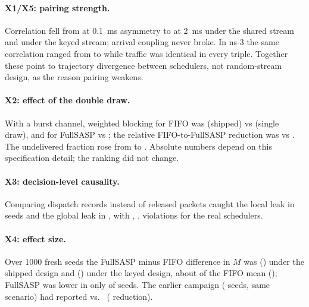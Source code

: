 \documentclass[11pt]{article}
\begin{document}
\paragraph{X1/X5: pairing strength.} Correlation fell from \XOneRhoLow{} at 0.1~ms asymmetry to \XOneRhoHigh{} at 2~ms under the shared stream and \XOneRhoHighKeyed{} under the keyed stream; arrival coupling never broke. In ns-3 the same correlation ranged from \XFiveRhoMin{} to \XFiveRhoMax{} while traffic was identical in every triple. Together these point to trajectory divergence between schedulers, not random-stream design, as the reason pairing weakens.
\paragraph{X2: effect of the double draw.} With a burst channel, weighted blocking for FIFO was \XTwoMShipFIFO{} (shipped) vs \XTwoMSingleFIFO{} (single draw), and for FullSASP \XTwoMShipSASP{} vs \XTwoMSingleSASP{}; the relative FIFO-to-FullSASP reduction was \XTwoRedShip{} vs \XTwoRedSingle{}. The undelivered fraction rose from \XTwoUndelShip{} to \XTwoUndelSingle{}. Absolute numbers depend on this specification detail; the ranking did not change.
\paragraph{X3: decision-level causality.} Comparing dispatch records instead of released packets caught the local leak in \XThreeLeakyLocal{} seeds and the global leak in \XThreeLeakyGlobal{}, with \XThreeFIFO{}, \XThreeFullSASP{}, \XThreeMeanOnly{} violations for the real schedulers.
\paragraph{X4: effect size.} Over 1000 fresh seeds the FullSASP minus FIFO difference in $M$ was \XFourDShared{} (\XFourCIShared{}) under the shipped design and \XFourDKeyed{} (\XFourCIKeyed{}) under the keyed design, about \XFourRel{} of the FIFO mean (\XFourFIFOKeyed{}); FullSASP was lower in only \XFourLowerKeyed{} of seeds. The earlier campaign (\OldN{} seeds, same scenario) had reported \OldFIFO{} vs.\ \OldSASP{} (\OldRel{} reduction).
\end{document}
